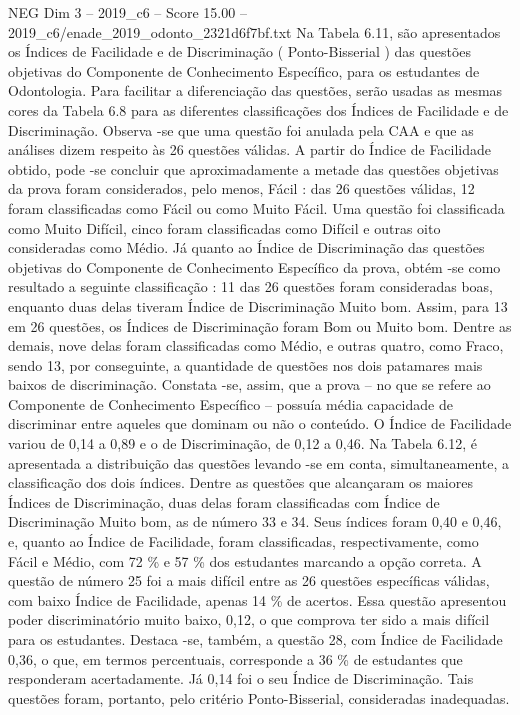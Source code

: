 \begin{textsample}{NEG Dim 3 – 2019\_c6 – Score 15.00 – 2019\_c6/enade\_2019\_odonto\_2321d6f7bf.txt}
Na Tabela 6.11, são apresentados os Índices de Facilidade e de Discriminação ( Ponto-Bisserial ) das questões objetivas do Componente de Conhecimento Específico, para os estudantes de Odontologia.
Para facilitar a diferenciação das questões, serão usadas as mesmas cores da Tabela 6.8 para as diferentes classificações dos Índices de Facilidade e de Discriminação.
Observa -se que uma questão foi anulada pela CAA e que as análises dizem respeito às 26 questões válidas.
A partir do Índice de Facilidade obtido, pode -se concluir que aproximadamente a metade das questões objetivas da prova foram considerados, pelo menos, Fácil : das 26 questões válidas, 12 foram classificadas como Fácil ou como Muito Fácil.
Uma questão foi classificada como Muito Difícil, cinco foram classificadas como Difícil e outras oito consideradas como Médio.
Já quanto ao Índice de Discriminação das questões objetivas do Componente de Conhecimento Específico da prova, obtém -se como resultado a seguinte classificação : 11 das 26 questões foram consideradas boas, enquanto duas delas tiveram Índice de Discriminação Muito bom.
Assim, para 13 em 26 questões, os Índices de Discriminação foram Bom ou Muito bom.
Dentre as demais, nove delas foram classificadas como Médio, e outras quatro, como Fraco, sendo 13, por conseguinte, a quantidade de questões nos dois patamares mais baixos de discriminação.
Constata -se, assim, que a prova – no que se refere ao Componente de Conhecimento Específico – possuía média capacidade de discriminar entre aqueles que dominam ou não o conteúdo.
O Índice de Facilidade variou de 0,14 a 0,89 e o de Discriminação, de 0,12 a 0,46.
Na Tabela 6.12, é apresentada a distribuição das questões levando -se em conta, simultaneamente, a classificação dos dois índices.
Dentre as questões que alcançaram os maiores Índices de Discriminação, duas delas foram classificadas com Índice de Discriminação Muito bom, as de número 33 e 34.
Seus índices foram 0,40 e 0,46, e, quanto ao Índice de Facilidade, foram classificadas, respectivamente, como Fácil e Médio, com 72 \% e 57 \% dos estudantes marcando a opção correta.
A questão de número 25 foi a mais difícil entre as 26 questões específicas válidas, com baixo Índice de Facilidade, apenas 14 \% de acertos.
Essa questão apresentou poder discriminatório muito baixo, 0,12, o que comprova ter sido a mais difícil para os estudantes.
Destaca -se, também, a questão 28, com Índice de Facilidade 0,36, o que, em termos percentuais, corresponde a 36 \% de estudantes que responderam acertadamente.
Já 0,14 foi o seu Índice de Discriminação.
Tais questões foram, portanto, pelo critério Ponto-Bisserial, consideradas inadequadas.

\end{textsample}
